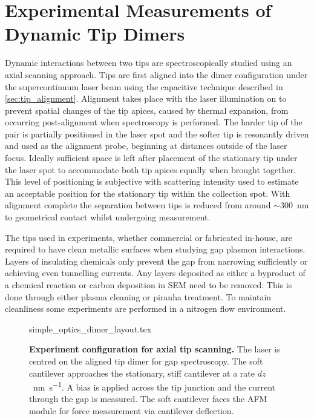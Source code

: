 \documentclass[a4paper]{article}
\begin{document}
\section{Experimental Measurements of Dynamic Tip Dimers}

Dynamic interactions between two tips are spectroscopically studied using an axial scanning approach. Tips are first aligned into the dimer configuration under the supercontinuum laser beam using the capacitive technique described in \ref{sec:tip_alignment}. Alignment takes place with the laser illumination on to prevent spatial changes of the tip apices, caused by thermal expansion, from occurring post-alignment when spectroscopy is performed. The harder tip of the pair is partially positioned in the laser spot and the softer tip is resonantly driven and used as the alignment probe, beginning at distances outside of the laser focus. Ideally sufficient space is left after placement of the stationary tip under the laser spot to accommodate both tip apices equally when brought together. This level of positioning is subjective with scattering intensity used to estimate an acceptable position for the stationary tip within the collection spot. With alignment complete the separation between tips is reduced from around $\sim$\SI{300}{nm} to geometrical contact whilst undergoing measurement.

The tips used in experiments, whether commercial or fabricated in-house, are required to have clean metallic surfaces when studying gap plasmon interactions. Layers of insulating chemicals only prevent the gap from narrowing sufficiently or achieving even tunnelling currents. Any layers deposited as either a byproduct of a chemical reaction or carbon deposition in SEM need to be removed. This is done through either plasma cleaning or piranha treatment. To maintain cleanliness some experiments are performed in a nitrogen flow environment.

\begin{figure}[bt]
\centering
\fontsize{10pt}{1em}\selectfont
\def\svgwidth{0.6\textwidth}
{simple_optics_dimer_layout.tex}
\caption[Experiment configuration for axial tip scanning]{\textbf{Experiment configuration for axial tip scanning.} The laser is centred on the aligned tip dimer for gap spectroscopy. The soft cantilever approaches the stationary, stiff cantilever at a rate $dz$~\si{\nano\metre\per\second}. A bias is applied across the tip junction and the current through the gap is measured. The soft cantilever faces the AFM module for force measurement via cantilever deflection.}
\label{fig:simple_optics_dimer_layout}
\end{figure}
\end{document}
